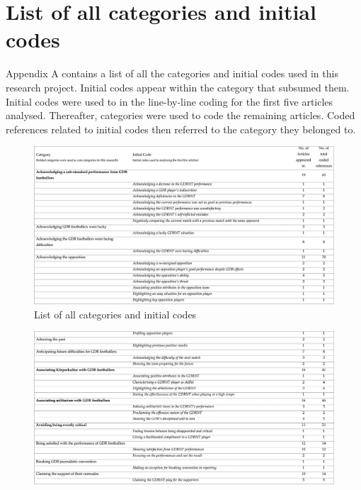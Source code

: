 \newpage
\appendix
\chapter{List of all categories and initial codes}

Appendix A contains a list of all the categories and initial codes used in this research project. Initial codes appear within the category that subsumed them. Initial codes were used to in the line-by-line coding for the first five articles analysed. Thereafter, categories were used to code the remaining articles. Coded references related to initial codes then referred to the category they belonged to.

\begin{landscape}
\begin{figure}[h]
\centering
\bigskip\bigskip\bigskip
\caption{List of all categories and initial codes}
\includegraphics[width=\linewidth]{mres/images/appendix/a1.png}
\end{figure}
\end{landscape}

\begin{landscape}
\begin{figure}[h]
\centering
\bigskip\bigskip\bigskip\bigskip\bigskip
\includegraphics[width=\linewidth]{mres/images/appendix/a2.png}
\end{figure}
\end{landscape}

